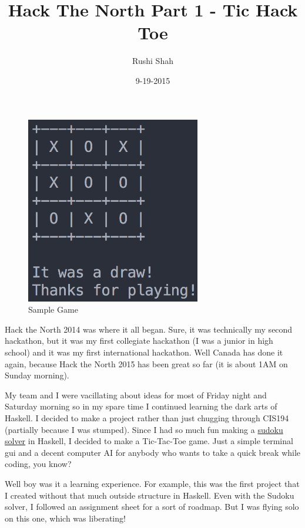 \documentclass[12pt]{article}
\title{Hack The North Part 1 - Tic Hack Toe}
\author{Rushi Shah}
\date{9-19-2015}
\begin{document}
	
	\begin{singlespace}
	\maketitle
	
	\begin{figure}[htbp]
	\centering
	\includegraphics[width=3in]{draw.png}
	\caption{Sample Game}
	\end{figure}
	\end{singlespace}

	Hack the North 2014 was where it all began. Sure, it was technically my
	second hackathon, but it was my first collegiate hackathon (I was a
	junior in high school) and it was my first international hackathon. Well
	Canada has done it again, because Hack the North 2015 has been great so
	far (it is about 1AM on Sunday morning).

	My team and I were vacillating about ideas for most of Friday night and
	Saturday morning so in my spare time I continued learning the dark arts
	of Haskell. I decided to make a project rather than just chugging
	through CIS194 (partially because I was stumped). Since I had so much
	fun making a \href{https://github.com/2016rshah/sudoku-solver}{sudoku
	solver} in Haskell, I decided to make a Tic-Tac-Toe game. Just a simple
	terminal gui and a decent computer AI for anybody who wants to take a
	quick break while coding, you know?

	Well boy was it a learning experience. For example, this was the first
	project that I created without that much outside structure in Haskell.
	Even with the Sudoku solver, I followed an assignment sheet for a sort
	of roadmap. But I was flying solo on this one, which was liberating!
\end{document}
